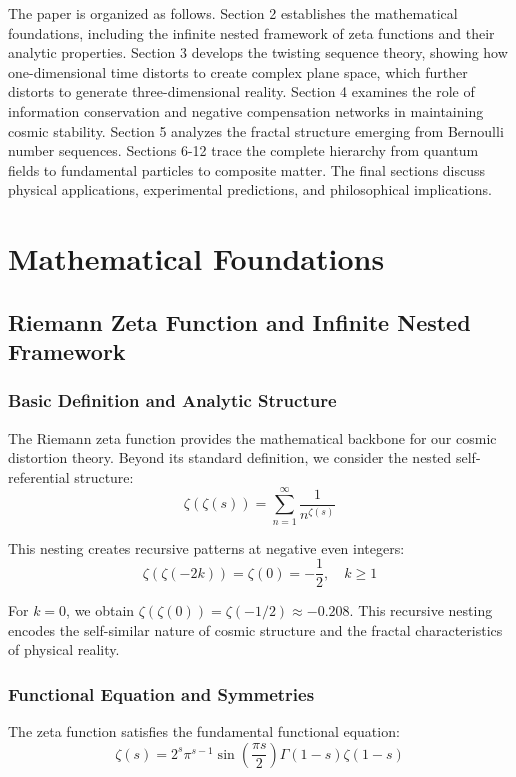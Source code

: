 \documentclass[11pt]{article}
\begin{document}
The paper is organized as follows. Section 2 establishes the mathematical foundations, including the infinite nested framework of zeta functions and their analytic properties. Section 3 develops the twisting sequence theory, showing how one-dimensional time distorts to create complex plane space, which further distorts to generate three-dimensional reality. Section 4 examines the role of information conservation and negative compensation networks in maintaining cosmic stability. Section 5 analyzes the fractal structure emerging from Bernoulli number sequences. Sections 6-12 trace the complete hierarchy from quantum fields to fundamental particles to composite matter. The final sections discuss physical applications, experimental predictions, and philosophical implications.

\section{Mathematical Foundations}

\subsection{Riemann Zeta Function and Infinite Nested Framework}

\subsubsection{Basic Definition and Analytic Structure}

The Riemann zeta function provides the mathematical backbone for our cosmic distortion theory. Beyond its standard definition, we consider the nested self-referential structure:
$$\zeta(\zeta(s)) = \sum_{n=1}^{\infty} \frac{1}{n^{\zeta(s)}}$$

This nesting creates recursive patterns at negative even integers:
$$\zeta(\zeta(-2k)) = \zeta(0) = -\frac{1}{2}, \quad k \geq 1$$

For $k = 0$, we obtain $\zeta(\zeta(0)) = \zeta(-1/2) \approx -0.208$. This recursive nesting encodes the self-similar nature of cosmic structure and the fractal characteristics of physical reality.

\subsubsection{Functional Equation and Symmetries}

The zeta function satisfies the fundamental functional equation:
$$\zeta(s) = 2^s \pi^{s-1} \sin\left(\frac{\pi s}{2}\right) \Gamma(1-s) \zeta(1-s)$$
\end{document}
